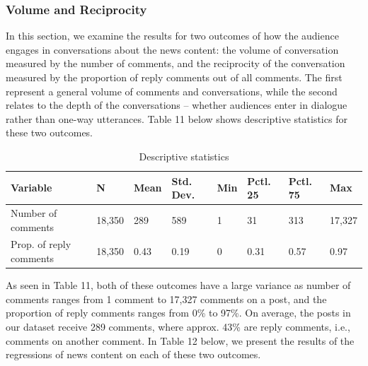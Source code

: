 \documentclass[
]{article}
\begin{document}
\hypertarget{volume-and-reciprocity}{%
\subsubsection{Volume and Reciprocity}\label{volume-and-reciprocity}}

\noindent In this section, we examine the results for two outcomes of
how the audience engages in conversations about the news content: the
volume of conversation measured by the number of comments, and the
reciprocity of the conversation measured by the proportion of reply
comments out of all comments. The first represent a general volume of
comments and conversations, while the second relates to the depth of the
conversations -- whether audiences enter in dialogue rather than one-way
utterances. Table 11 below shows descriptive statistics for these two
outcomes.

\begin{table}[H]

\caption{\label{tab:comment_describe}Descriptive statistics}
\centering
\begin{tabular}[t]{llllllll}
\toprule
Variable & N & Mean & Std. Dev. & Min & Pctl. 25 & Pctl. 75 & Max\\
\midrule
Number of comments & 18,350 & 289 & 589 & 1 & 31 & 313 & 17,327\\
Prop. of reply comments & 18,350 & 0.43 & 0.19 & 0 & 0.31 & 0.57 & 0.97\\
\bottomrule
\end{tabular}
\end{table}

\noindent As seen in Table 11, both of these outcomes have a large
variance as number of comments ranges from 1 comment to 17,327 comments
on a post, and the proportion of reply comments ranges from 0\% to 97\%.
On average, the posts in our dataset receive 289 comments, where approx.
43\% are reply comments, i.e., comments on another comment. In Table 12
below, we present the results of the regressions of news content on each
of these two outcomes.
\end{document}
